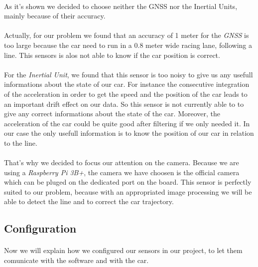 \paragraph{}
As it's shown we decided to choose neither the GNSS nor the Inertial 
Units, mainly because of their accuracy.

\paragraph{}
Actually, for our problem we found that an accuracy of 1 meter
for the \textit{GNSS} is too large because the car need to run in a 0.8 meter
wide racing lane, following a line. This sensors is alos not able to know if
the car position is correct.

\paragraph{}
For the \textit{Inertial Unit}, we found that this sensor is too noisy to
give us any usefull informations about the state of our car. For instance the
consecutive integration of the acceleration in order to get the speed and the
position of the car leads to an important drift effect on our data. So this
sensor is not currently able to to give any correct informations about the state
of the car. Moreover, the acceleration of the car could be quite good after filtering
if we only needed it. In our case the only usefull information is to know the
position of our car in relation to the line.

\paragraph{}
That's why we decided to focus our attention on the camera. Because
we are using a \textit{Raspberry Pi 3B+}, the camera we have choosen is the official 
camera which can be pluged on the dedicated port on the board. This sensor is
perfectly suited to our problem, because with an appropriated image processing
we will be able to detect the line and to correct the car trajectory.

\subsection{Configuration}
\paragraph{}
Now we will explain how we configured our sensors in our project, to
let them comunicate with the software and with the car.


